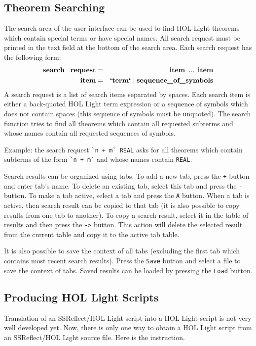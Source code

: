 \documentclass[a4paper]{article}
\newcommand{\xx}[1]{\mathop{\text{\bf #1}}}
\begin{document}
\subsection{Theorem Searching}
The search area of the user interface can be used to find HOL Light theorems which contain special terms or have special names. All search request must be printed in the text field at the bottom of the search area. Each search request has the following form:
\begin{eqnarray*}
\xx{search\_request} &=& \xx{item}\ ...\ \xx{item}\\
\xx{item} &=& \xx{`term`} \mathrel{|} \xx{sequence\_of\_symbols}
\end{eqnarray*}
A search request is a list of search items separated by spaces. Each search item is either a back-quoted HOL Light term expression or a sequence of symbols which does not contain spaces (this sequence of symbols must be unquoted). The search function tries to find all theorems which contain all requested subterms and whose names contain all requested sequences of symbols.

Example: the search request \verb|`n + m` REAL| asks for all theorems which contain subterms of the form \verb|`n + m`| and whose names contain \verb|REAL|.

Search results can be organized using tabs. To add a new tab, press the \verb|+| button and enter tab's name. To delete an existing tab, select this tab and press the \verb|-| button. To make a tab active, select a tab and press the \verb|A| button. When a tab is active, then search result can be copied to that tab (it is also possible to copy results from one tab to another). To copy a search result, select it in the table of results and then press the \verb|->| button. This action will delete the selected result from the current table and copy it to the active tab table.

It is also possible to save the context of all tabs (excluding the first tab which contains most recent search results). Press the {\tt Save} button and select a file to save the context of tabs. Saved results can be loaded by pressing the {\tt Load} button.





\subsection{Producing HOL Light Scripts}
Translation of an SSReflect/HOL Light script into a HOL Light script is not very well developed yet. Now, there is only one way to obtain a HOL Light script from an SSReflect/HOL Light source file. Here is the instruction.
\end{document}
